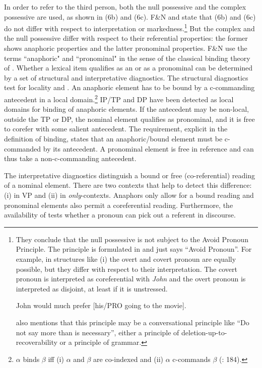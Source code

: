 \documentclass[output=paper]{langsci/langscibook}
\begin{document}
In order to refer to the third person, both the null possessive and the complex possessive are used, as shown in (6b) and (6c). F\&N and \citet{Rodrigues2010} state that (6b) and (6c) do not differ with respect to interpretation or markedness.\footnote{They conclude that the null possessive is not subject to the Avoid Pronoun Principle. The principle is formulated in \citet{Chomsky1981} and just says “Avoid Pronoun”. For example, in structures like (i) the overt and covert pronoun are equally possible, but they differ with respect to their interpretation. The covert pronoun is interpreted as coreferential with \textit{John} and the overt pronoun is interpreted as disjoint, at least if it is unstressed.

\ea   John would much prefer [his\slash PRO going to the movie].\\
  \z

\citet[65]{Chomsky1981} also mentions that this principle may be a conversational principle like “Do not say more than is necessary”, either a principle of deletion-up-to-recoverability or a principle of grammar.} But the complex and the null possessive differ with respect to their referential properties: the former shows anaphoric properties and the latter pronominal properties. F\&N use the terms “anaphoric" and “pronominal" in the sense of the classical binding theory of \citet{Chomsky1981,Chomsky1986Knowledge}. Whether a lexical item qualifies as an  or as a pronominal can be determined by a set of structural and interpretative diagnostics. The structural diagnostics test for locality and . An anaphoric element has to be bound by a c-commanding antecedent in a local domain.\footnote{$\alpha $ binds $\beta $ iff (i) $\alpha $ and $\beta $ are co-indexed and (ii) $\alpha $ c-commands $\beta $ (\citealt{Chomsky1981}: 184).} IP\slash TP and DP have been detected as local domains for binding of anaphoric elements. If the antecedent may be non-local, outside the TP or DP, the nominal element qualifies as pronominal, and it is free to corefer with some salient antecedent. The  requirement, explicit in the definition of binding, states that an anaphoric\slash bound element must be c-commanded by its antecedent. A pronominal element is free in reference and can thus take a non-c-commanding antecedent.

The interpretative diagnostics distinguish a bound or free (co-referential) reading of a nominal element. There are two contexts that help to detect this difference: (i) in VP  and (ii) in \textit{only}{}-contexts. Anaphors only allow for a bound reading and pronominal elements also permit a coreferential reading. Furthermore, the availability of  tests whether a pronoun can pick out a referent in discourse.
\end{document}
